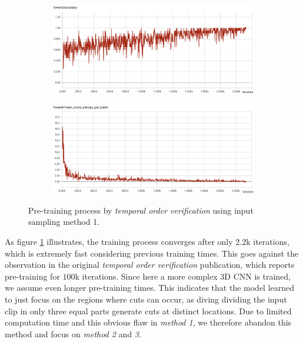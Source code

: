 \begin{figure}[H]
    \begin{subfigure}[c]{\textwidth}
    \centering
    \includegraphics[width=\textwidth]{img_evaluation/pretrain1/tower0accuracy}
    \end{subfigure}
    \begin{subfigure}[c]{\textwidth}
    \includegraphics[width=\textwidth]{img_evaluation/pretrain1/tower0crossentropy}
    \end{subfigure}
    \caption{Pre-training process by \textit{temporal order verification} using input sampling method 1.}
    \label{fig:pretrain1}
\end{figure}

As figure \ref{fig:pretrain1} illustrates, the training process converges after only $2.2$k iterations, which is extremely fast considering previous training times.
This goes against the observation in the original \textit{temporal order verification} publication\cite{misra_shuffle_2016}, which reports pre-training for $100$k iterations.
Since here a more complex 3D CNN is trained, we assume even longer pre-training times.
This indicates that the model learned to just focus on the regions where cuts can occur, as diving dividing the input clip in only three equal parts generate cuts at distinct locations.
Due to limited computation time and this obvious flaw in \textit{method 1}, we therefore abandon this method and focus on \textit{method 2} and \textit{3}.
\bigskip

